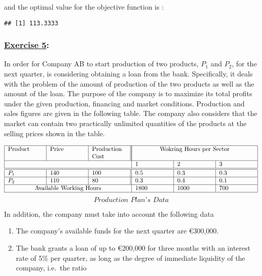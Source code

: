 \documentclass[
]{article}
\newenvironment{Shaded}{\begin{snugshade}}{\end{snugshade}}
\newcommand{\NormalTok}[1]{#1}
\newcommand{\SpecialCharTok}[1]{\textcolor[rgb]{0.00,0.00,0.00}{#1}}
\providecommand{\tightlist}{%
  \setlength{\itemsep}{0pt}\setlength{\parskip}{0pt}}
\begin{document}
and the optimal value for the objective function is :

\begin{Shaded}
\end{Shaded}

\begin{verbatim}
## [1] 113.3333
\end{verbatim}

\hypertarget{section-8}{%
\subsubsection{\texorpdfstring{\underline{Exercise 5}:}{:}}\label{section-8}}

In order for Company AB to start production of two products, \(P_1\) and
\(P_2\), for the next quarter, is considering obtaining a loan from the
bank. Specifically, it deals with the problem of the amount of
production of the two products as well as the amount of the loan. The
purpose of the company is to maximize its total profits under the given
production, financing and market conditions. Production and sales
figures are given in the following table. The company also considers
that the market can contain two practically unlimited quantities of the
products at the selling prices shown in the table.

\[
\begin{tabular}{ |p{2cm}|p{2cm}|p{2cm}||p{2cm}|p{2cm}|p{2cm}|  } \hline
  Product & Price & Production Cost & \multicolumn{3}{|c|}{Wokring Hours per Sector} \\ \hline
  \multicolumn{3}{|c|}{} & 1 & 2 & 3\\ \hline
 \hline
  $P_1$ & 140 & 100 & 0.5 & 0.3 & 0.3 \\ \hline
  $P_2$ & 110 & 80 & 0.3 & 0.4 & 0.1 \\ \hline
  \multicolumn{3}{|c|}{Available Working Hours} & 1800 & 1000 & 700 \\ \hline
\end{tabular}
\] \[
\textit{Production Plan's Data}
\]

In addition, the company must take into account the following data

\begin{enumerate}
\def\labelenumi{\arabic{enumi}.}
\tightlist
\item
  The company's available funds for the next quarter are €300,000.
\item
  The bank grants a loan of up to €200,000 for three months with an
  interest rate of 5\% per quarter, as long as the degree of immediate
  liquidity of the company, i.e.~the ratio
\end{enumerate}
\end{document}
